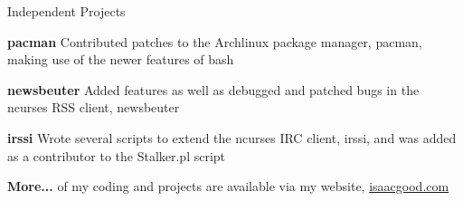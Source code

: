 \documentclass{resume}
\begin{document}
  \begin{rSection}{Independent Projects}
    \begin{rSubsection}{}{}{}{}
      \item \textbf{pacman} Contributed patches to the Archlinux package manager, pacman, making use of the newer features of bash
      \item \textbf{newsbeuter} Added features as well as debugged and patched bugs in the ncurses RSS client, newsbeuter
      \item \textbf{irssi} Wrote several scripts to extend the ncurses IRC client, irssi, and was added as a contributor to the Stalker.pl script
      \item \textbf{More...} of my coding and projects are available via my website, \href{http://www.isaacgood.com/}{isaacgood.com}
    \end{rSubsection}
  \end{rSection}


\begin{comment}
    \begin{rSubsection}{OANDA Corporation}{Jan 2012 - Mar 2012}{Integrator}{Toronto, ON}
      \item Deployed software packages in a testing environment
      \item Detected and stopped bugs before software reached production machines
      \item Learned the software system on a broad, high level
      \item Interacted and collaborated with members of many other teams across
    \end{rSubsection}
\end{comment}

\begin{comment}
    \begin{rSubsection}{Artificial Perception Laboratory (APL)}{May 2007 - Aug 2007}{Team Lead}{Toronto, ON}
      \item Conducted a broad range of projects to help further APL’s research, advancing APLs position in the industry
      \item Led a team of five volunteer students, delivering instructions on a weekly basis and gathering progress reports
      \item Reported weekly to coordinator and other team leaders allowing the different teams to complement each other's productivity
    \end{rSubsection}
\end{comment}
\end{document}
